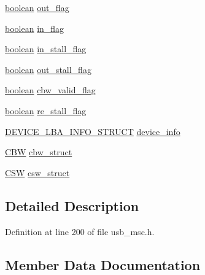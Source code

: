 \begin{DoxyCompactItemize}
\item 
\hyperlink{types_8h_a7670a4e8a07d9ebb00411948b0bbf86d}{boolean} \hyperlink{struct__msc__variable__struct_a01fa1cb9f93e868cfff642b9114a1839}{out\+\_\+flag}
\item 
\hyperlink{types_8h_a7670a4e8a07d9ebb00411948b0bbf86d}{boolean} \hyperlink{struct__msc__variable__struct_af4f7f5d0f14889d5bbb0a23a341e406b}{in\+\_\+flag}
\item 
\hyperlink{types_8h_a7670a4e8a07d9ebb00411948b0bbf86d}{boolean} \hyperlink{struct__msc__variable__struct_aaef832f554e060e676fb9a7569c46a7b}{in\+\_\+stall\+\_\+flag}
\item 
\hyperlink{types_8h_a7670a4e8a07d9ebb00411948b0bbf86d}{boolean} \hyperlink{struct__msc__variable__struct_a746c7ecb22e6ca034a99188b4db4c99f}{out\+\_\+stall\+\_\+flag}
\item 
\hyperlink{types_8h_a7670a4e8a07d9ebb00411948b0bbf86d}{boolean} \hyperlink{struct__msc__variable__struct_ac8a67f0248d18e0cb1face921b7f5d11}{cbw\+\_\+valid\+\_\+flag}
\item 
\hyperlink{types_8h_a7670a4e8a07d9ebb00411948b0bbf86d}{boolean} \hyperlink{struct__msc__variable__struct_ad64fdfc66a6a5bb4f467b49b496834db}{re\+\_\+stall\+\_\+flag}
\item 
\hyperlink{usb__msc_8h_adf6420ffba647e8640587e01109be442}{D\+E\+V\+I\+C\+E\+\_\+\+L\+B\+A\+\_\+\+I\+N\+F\+O\+\_\+\+S\+T\+R\+U\+CT} \hyperlink{struct__msc__variable__struct_a40c933f55306427f4162b137e2c84138}{device\+\_\+info}
\item 
\hyperlink{usb__msc_8h_a940030172208122e7635c92135bb4f17}{C\+BW} \hyperlink{struct__msc__variable__struct_a2a316935831a9e2a6f50a06d856bd098}{cbw\+\_\+struct}
\item 
\hyperlink{usb__msc_8h_ad1e0b7fd2cc83bd3482363fdba93f3f0}{C\+SW} \hyperlink{struct__msc__variable__struct_a2eebe2bdd2dd70959b6d5e0d1613a28b}{csw\+\_\+struct}
\end{DoxyCompactItemize}


\subsection{Detailed Description}


Definition at line 200 of file usb\+\_\+msc.\+h.



\subsection{Member Data Documentation}
